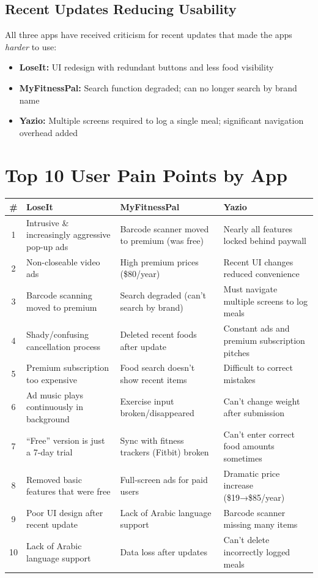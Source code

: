 \documentclass[12pt, a4paper]{article}
\begin{document}
\subsection{Recent Updates Reducing Usability}

All three apps have received criticism for recent updates that made the apps \textit{harder} to use:

\begin{itemize}
    \item \textbf{LoseIt:} UI redesign with redundant buttons and less food visibility
    \item \textbf{MyFitnessPal:} Search function degraded; can no longer search by brand name
    \item \textbf{Yazio:} Multiple screens required to log a single meal; significant navigation overhead added
\end{itemize}

\section{Top 10 User Pain Points by App}

\begin{table}[h!]
\centering
\small
\begin{tabular}{|c|p{3.5cm}|p{3.5cm}|p{3.5cm}|}
\hline
\textbf{\#} & \textbf{LoseIt} & \textbf{MyFitnessPal} & \textbf{Yazio} \\
\hline
1 & Intrusive \& increasingly aggressive pop-up ads & Barcode scanner moved to premium (was free) & Nearly all features locked behind paywall \\
\hline
2 & Non-closeable video ads & High premium prices (\$80/year) & Recent UI changes reduced convenience \\
\hline
3 & Barcode scanning moved to premium & Search degraded (can't search by brand) & Must navigate multiple screens to log meals \\
\hline
4 & Shady/confusing cancellation process & Deleted recent foods after update & Constant ads and premium subscription pitches \\
\hline
5 & Premium subscription too expensive & Food search doesn't show recent items & Difficult to correct mistakes \\
\hline
6 & Ad music plays continuously in background & Exercise input broken/disappeared & Can't change weight after submission \\
\hline
7 & ``Free'' version is just a 7-day trial & Sync with fitness trackers (Fitbit) broken & Can't enter correct food amounts sometimes \\
\hline
8 & Removed basic features that were free & Full-screen ads for paid users & Dramatic price increase (\$19→\$85/year) \\
\hline
9 & Poor UI design after recent update & Lack of Arabic language support & Barcode scanner missing many items \\
\hline
10 & Lack of Arabic language support & Data loss after updates & Can't delete incorrectly logged meals \\
\hline
\end{tabular}
\end{table}
\end{document}
